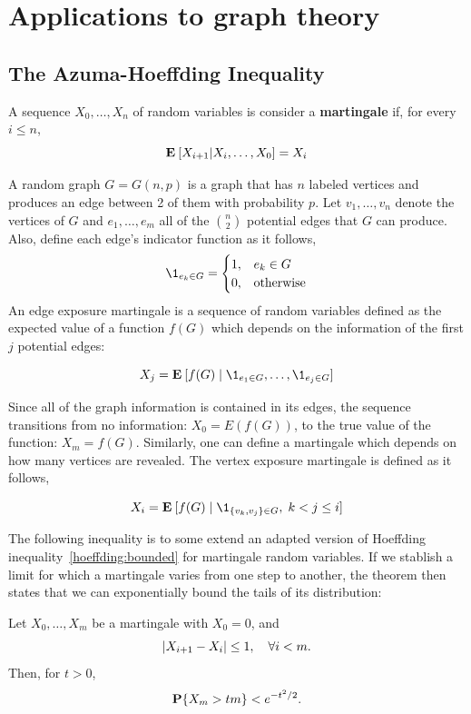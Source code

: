 \chapter{Applications to graph theory}

\section{The Azuma-Hoeffding Inequality}

\begin{definition}
    A sequence $X_0, \ldots, X_n$ of random variables is consider a \textbf{martingale} if, for every $i \leq n$,
    \[ \E [X_{i+1} | X_i,\ldots, X_0] = X_i \] 
\end{definition}

A random graph $G = G(n,p)$ is a graph that has $n$ labeled vertices and produces an edge between 2 of them with probability $p$. Let $v_1, \ldots, v_n$ denote the vertices of $G$ and $e_1, \ldots, e_m$ all of the $\binom{n}{2}$ potential edges that $G$ can produce. Also, define each edge's indicator function as it follows,
\[\1_{e_k \in G} = \begin{cases}
    1, & e_k \in G\\
    0, & \mbox{otherwise} 
\end{cases} \] 
An edge exposure martingale is a sequence of random variables defined as the expected value of a function $f(G)$ which depends on the information of the first $j$ potential edges:

\[ X_j = \E [f(G) \;|\; \1_{e_1 \in G}, \ldots, \1_{e_j \in G}] \] 

Since all of the graph information is contained in its edges, the sequence transitions from no information: $X_0 = E(f(G))$, to the true value of the function: $X_m = f(G)$. Similarly, one can define a martingale which depends on how many vertices are revealed. The vertex exposure martingale is defined as it follows,

\[ X_i = \E [f(G) \;|\; \1_{\{v_k, v_j\}\in G}, \; k < j \leq i] \] 

The following inequality is to some extend an adapted version of Hoeffding inequality~\ref{hoeffding:bounded} for martingale random variables. If we stablish a limit for which a martingale varies from one step to another, the theorem then states that we can exponentially bound the tails of its distribution:

\begin{theorem}\label{azuma}
    Let $X_0, \ldots, X_m$ be a martingale with $X_0 = 0$, and
    \[ |X_{i+1} - X_i| \leq 1, \hspace*{1em} \forall i < m. \]
    Then, for $t > 0$,
    \[ \P\{X_m > tm\} < e^{-t^2 / 2}. \] 
\end{theorem}

